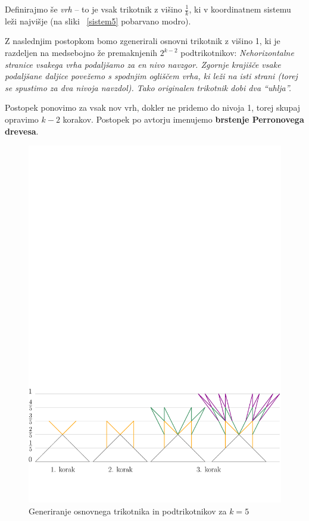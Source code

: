 \documentclass[a4paper, 12pt]{article}
\begin{document}
Definirajmo še \emph{vrh} -- to je vsak trikotnik z višino $ \frac{1}{k} $, ki v koordinatnem sistemu leži najvišje (na sliki ~\ref{sistem5} pobarvano modro).

Z naslednjim postopkom bomo zgenerirali osnovni trikotnik z višino 1, ki je razdeljen na medsebojno že premaknjenih $ 2^{k-2} $ podtrikotnikov: \emph{Nehorizontalne stranice vsakega vrha podaljšamo za en nivo navzgor. Zgornje krajišče vsake podaljšane daljice povežemo s spodnjim ogliščem vrha, ki leži na isti strani (torej se spustimo za dva nivoja navzdol). Tako originalen trikotnik dobi dva ``uhlja''.}

Postopek ponovimo za vsak nov vrh, dokler ne pridemo do nivoja 1, torej skupaj opravimo $ k-2 $ korakov. Postopek po avtorju imenujemo \textbf{brstenje Perronovega drevesa}.

\begin{figure}[h!]
    \centering
    \includegraphics[width=\textwidth]{ipe_slike/koraki.pdf}
    \caption{Generiranje osnovnega trikotnika in podtrikotnikov za $ k = 5 $}
    \label{koraki}
\end{figure}
\end{document}

